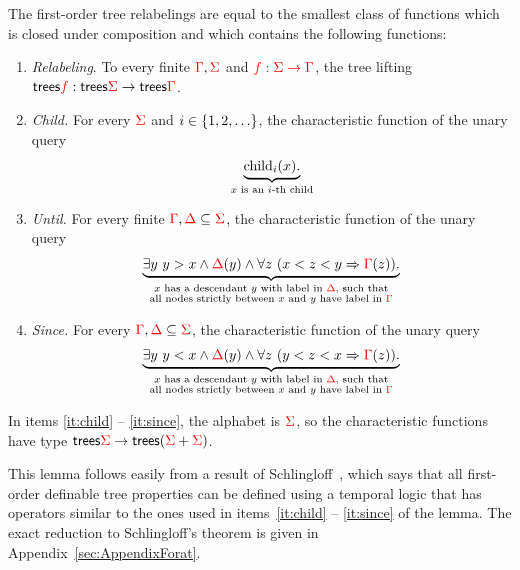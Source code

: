 \begin{lemma}\label{lem:schlingloff} The first-order tree relabelings are equal to the smallest class of functions which is closed under composition and which  contains the following functions:
    \begin{enumerate}
        \item \label{it:relabeling} \emph{Relabeling}. To every finite ${\color{red}{\Gamma}},{\color{red}{\Sigma}}$ and ${\color{red}{f : {\color{red}{\Sigma}}\to {\color{red}{\Gamma}}}}$, the tree lifting $\mathsf {trees} {\color{red}{f}} : \mathsf {trees} {\color{red}{\Sigma}} \to \mathsf {trees} {\color{red}{\Gamma}}$.
        \item \label{it:child} \emph{Child.} For every ${\color{red}{\Sigma}}$ and  $i \in \{1,2,\ldots\}$, the characteristic function of the  unary query 
        \begin{align*}
            \underbrace{\mathrm{child}_{i} (x).}_{\text{$x$ is an $i$-th child}}
        \end{align*}
         \item \label{it:until} \emph{Until.} For every finite ${\color{red}{\Gamma}}, {\color{red}{\Delta}} \subseteq {\color{red}{\Sigma}}$,  the characteristic function of the unary query
         \begin{align*}
              \underbrace{\exists y\ y > x \land {\color{red}{\Delta}}(y) \land  \forall z \ (x < z < y \Rightarrow {\color{red}{\Gamma}}(z)).}_{\substack{\text{$x$ has a descendant $y$ with label in ${\color{red}{\Delta}}$, such that}\\ \text{all nodes strictly between $x$ and $y$ have label in ${\color{red}{\Gamma}}$}}} 
         \end{align*} 
         \item \label{it:since}\emph{Since.} For every ${\color{red}{\Gamma}}, {\color{red}{\Delta}} \subseteq {\color{red}{\Sigma}}$,    the characteristic function of the unary query
         \begin{align*}
              \underbrace{\exists y\ y < x \land {\color{red}{\Delta}}(y) \land  \forall z \ (y < z < x \Rightarrow {\color{red}{\Gamma}}(z)).}_{\substack{\text{$x$ has a descendant $y$ with label in ${\color{red}{\Delta}}$, such that}\\ \text{all nodes strictly between $x$ and $y$ have label in ${\color{red}{\Gamma}}$}}}  
         \end{align*} 
    \end{enumerate}
    In items \ref{it:child} -- \ref{it:since}, the alphabet is ${\color{red}{\Sigma}}$, so the characteristic functions have type $\mathsf {trees} {\color{red}{\Sigma}} \to \mathsf {trees}({\color{red}{\Sigma}} + {\color{red}{\Sigma}})$. 
\end{lemma}

This lemma follows easily from a result of Schlingloff~\cite[Theorem 2.6]{schlingloff1992expressive}, which says that all first-order definable tree properties can be defined using a temporal logic that has operators similar to the ones used in items~\ref{it:child} -- \ref{it:since} of the lemma. The exact reduction to Schlingloff's theorem is given in Appendix~\ref{sec:AppendixForat}.


